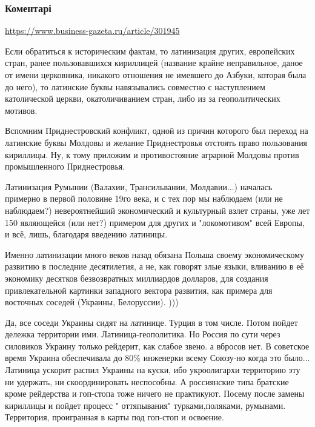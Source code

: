  
 
 
 
 
\subsubsection{Коментарі}

\begin{itemize} %
\url{https://www.business-gazeta.ru/article/301945}


Если обратиться к историческим фактам, то латинизация других, европейских
стран, ранее пользовавшихся кириллицей (название крайне неправильное, даное от
имени церковника, никакого отношения не имевшего до Азбуки, которая была до
него), то латинские буквы навязывались совместно с наступлением католической
церкви, окатоличиванием стран, либо из за геополитических мотивов.

Вспомним Приднестровский конфликт, одной из причин которого был переход на
латинские буквы Молдовы и желание Приднестровья отстоять право пользования
кириллицы. Ну, к тому приложим и противостояние аграрной Молдовы против
промышленного Приднестровья.

Латинизация Румынии (Валахии, Трансильвании, Молдавии...) началась примерно в
первой половине 19го века, и с тех пор мы наблюдаем (или не наблюдаем?)
невероятнейший экономический и культурный взлет страны, уже лет 150 являющейся
(или нет?) примером для других и "локомотивом" всей Европы, и всё, лишь,
благодаря введению латиницы.

Именно латинизации много веков назад обязана Польша своему экономическому
развитию в последние десятилетия, а не, как говорят злые языки, вливанию в её
экономику десятков безвозвратных миллиардов долларов, для создания
привлекательной картинки западного вектора развития, как примера для восточных
соседей (Украины, Белоруссии). )))


Да, все соседи Украины сидят на латинице. Турция в том числе. Потом пойдет
дележка территории ими. Латиница-геополитика. Но Россия по сути через силовиков
Украину только рейдерит, как слабое звено. а вбросов нет. В советское время
Украина обеспечивала до 80\% инженерки всему Союзу-но когда это было...
Латиница ускорит распил Украины на куски, ибо укроолигархи территорию эту ни
удержать, ни скоординировать неспособны. А россиянские типа братские кроме
рейдерства и гоп-стопа тоже ничего не практикуют. Посему после замены кириллицы
и пойдет процесс " оттяпывания" турками,поляками, румынами. Территория,
проигранная в карты под гоп-стоп и освоение.


\end{itemize}
